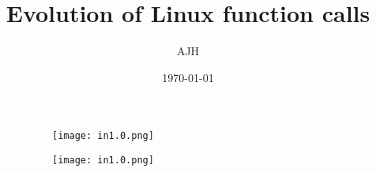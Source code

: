 \documentclass{article}
\title{Evolution of Linux function calls}
\author{AJH}
\date{\today}
\begin{document}
\maketitle

\begin{figure}[ht]
  \begin{subfigure}{.5\textwidth}
    \centering
        \texttt{[image: in1.0.png]}
      \end{subfigure}
      \begin{subfigure}{.5\textwidth}
    \centering
        \texttt{[image: in1.0.png]}
      \end{subfigure}
\end{figure}
\end{document}
